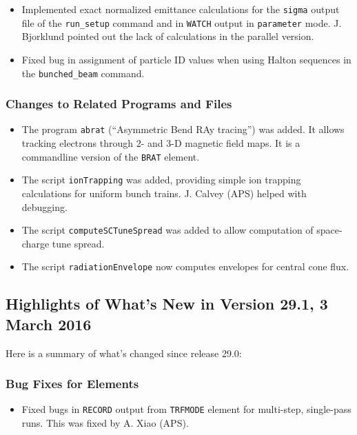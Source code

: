 \documentclass[11pt]{article}
\begin{document}
\begin{itemize}
\item Implemented exact normalized emittance calculations for the \verb|sigma| output file of the \verb|run_setup| command and in \verb|WATCH|
  output in \verb|parameter| mode. J. Bjorklund pointed out the lack of calculations in the parallel version.
\item Fixed bug in assignment of particle ID values when using Halton sequences in the \verb|bunched_beam| command.
\end{itemize}

\subsubsection{Changes to Related Programs and Files}

\begin{itemize}
\item The program \verb|abrat| (``Asymmetric Bend RAy tracing'') was added. It allows tracking electrons through 2- and 3-D magnetic field maps.
  It is a commandline version of the \verb|BRAT| element.
\item The script \verb|ionTrapping| was added, providing simple ion trapping calculations for uniform bunch trains. J. Calvey (APS) helped with
  debugging.
\item The script \verb|computeSCTuneSpread| was added to allow computation of space-charge tune spread.
\item The script \verb|radiationEnvelope| now computes envelopes for central cone flux.
\end{itemize}

\subsection{Highlights of What's New in Version 29.1, 3 March 2016}

Here is a summary of what's changed since release 29.0:

\subsubsection{Bug Fixes for Elements}

\begin{itemize}
\item Fixed bugs in \verb|RECORD| output from \verb|TRFMODE| element for multi-step, single-pass runs.
  This was fixed by A. Xiao (APS).
\end{itemize}
\end{document}
